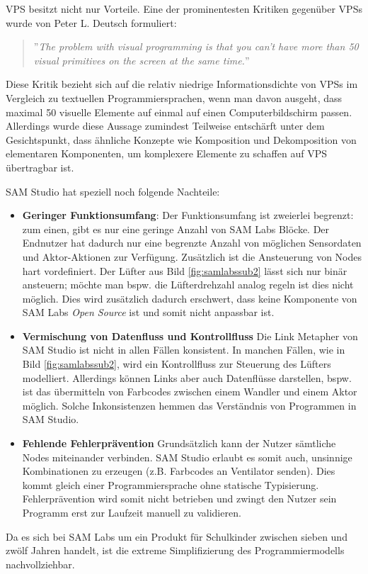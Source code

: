 \ac{VPS} besitzt nicht nur Vorteile. Eine der prominentesten Kritiken gegenüber \acp{VPS} wurde von Peter L. Deutsch \cite{MASON201368} formuliert:

\begin{quote}
    ''\textit{The problem with visual programming is that you can’t have more than 50 visual primitives on the screen at the same time.}''
\end{quote}


Diese Kritik bezieht sich auf die relativ niedrige Informationsdichte von \acp{VPS} im Vergleich zu textuellen Programmiersprachen, wenn man davon ausgeht, dass maximal 50 visuelle Elemente auf einmal auf einen Computerbildschirm passen. Allerdings wurde diese Aussage zumindest Teilweise entschärft unter dem Gesichtspunkt, dass ähnliche Konzepte wie Komposition und Dekomposition von elementaren Komponenten, um komplexere Elemente zu schaffen auf \ac{VPS} übertragbar ist.

SAM Studio hat speziell noch folgende Nachteile:
\begin{itemize}
    \item \textbf{Geringer Funktionsumfang}: Der Funktionsumfang ist zweierlei begrenzt: zum einen, gibt es nur eine geringe Anzahl von SAM Labs Blöcke. Der Endnutzer hat dadurch nur eine begrenzte Anzahl von möglichen Sensordaten und Aktor-Aktionen zur Verfügung. Zusätzlich ist die Ansteuerung von Nodes hart vordefiniert. Der Lüfter aus Bild \ref{fig:samlabssub2} lässt sich nur binär ansteuern; möchte man bspw. die Lüfterdrehzahl analog regeln ist dies nicht möglich. Dies wird zusätzlich dadurch erschwert, dass keine Komponente von SAM Labs \textit{Open Source} ist und somit nicht anpassbar ist.
    \item \textbf{Vermischung von Datenfluss und Kontrollfluss} Die Link Metapher von SAM Studio ist nicht in allen Fällen konsistent. In manchen Fällen, wie in Bild \ref{fig:samlabssub2}, wird ein Kontrollfluss zur Steuerung des Lüfters modelliert. Allerdings können Links aber auch Datenflüsse darstellen, bspw. ist das übermitteln von Farbcodes zwischen einem Wandler und einem Aktor möglich. Solche Inkonsistenzen hemmen das Verständnis von Programmen in SAM Studio.
    \item \textbf{Fehlende Fehlerprävention} Grundsätzlich kann der Nutzer sämtliche Nodes miteinander verbinden. SAM Studio erlaubt es somit auch, unsinnige Kombinationen zu erzeugen (z.B. Farbcodes an Ventilator senden). Dies kommt gleich einer Programmiersprache ohne statische Typisierung. Fehlerprävention wird somit nicht betrieben und zwingt den Nutzer sein Programm erst zur Laufzeit manuell zu validieren.
\end{itemize}
Da es sich bei SAM Labs um ein Produkt für Schulkinder zwischen sieben und zwölf Jahren handelt, ist die extreme Simplifizierung des Programmiermodells nachvollziehbar. 

